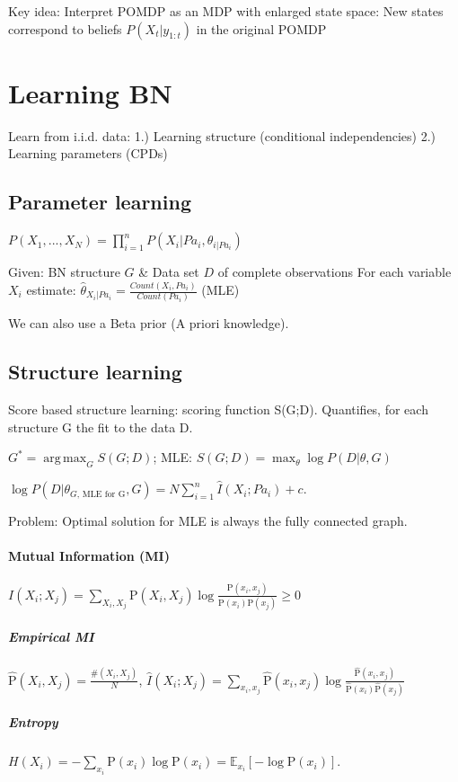 \documentclass[a4paper, 10pt]{scrartcl}
\DeclareMathOperator*{\argmax}{arg\,max}
\newcommand{\uP}{\mathrm P}
\begin{document}
\begin{multicols*}{3}
Key idea: Interpret POMDP as an MDP with enlarged state space: New states correspond to beliefs $P(X_t | y_{1:t})$ in the original POMDP

\section{Learning BN}
Learn from i.i.d. data: 1.) Learning structure (conditional independencies) 2.) Learning parameters (CPDs)

\subsection{Parameter learning}
$P(X_1, ..., X_N) = \prod_{i=1}^{n} P(X_i | Pa_i, {\theta}_{i | Pa_i})$

Given:  BN structure $G$ \& Data set $D$ of complete observations
For each variable $X_i$ estimate: $\hat{\theta}_{X_i | Pa_i} = \frac{Count(X_i , Pa_i)}{Count(Pa_i)}$ (MLE)

We can also use a Beta prior (A priori knowledge).

\subsection{Structure learning}
Score based structure learning: scoring function S(G;D). Quantifies, for each structure G the fit to the data D. 

$G^* = \argmax_G S(G;D)$; MLE: $S(G;D) = \max_\theta \log P(D | \theta, G)$

$\log P(D | \theta_{G \text{, MLE for G}}, G) = N \sum_{i=1}^{n} \hat{I}(X_i; Pa_i) + c$.

Problem: Optimal solution for MLE is always the fully  connected graph. 

\paragraph{Mutual Information (MI)}
$I(X_i; X_j) = \sum_{X_i, X_j} \uP(X_i, X_j) \log \frac{\uP(x_i, x_j)}{\uP(x_i) \uP(x_j)} \geq 0$

\subparagraph{Empirical MI}
$\hat{\uP}(X_i, X_j) = \frac{\#(X_i, X_j)}{N}$, $\hat I(X_i; X_j) = \sum_{x_i, x_j} \hat{\uP}(x_i, x_j) \log \frac{\hat{\uP}(x_i, x_j)}{\hat{\uP}(x_i) \hat{\uP}(x_j)}$

\subparagraph{Entropy}
$H(X_i) = -\sum_{x_i}\uP(x_i)\log\uP(x_i) = \mathbb{E}_{x_i}[-\log\uP(x_i)]$.


\end{multicols*}
\end{document}
